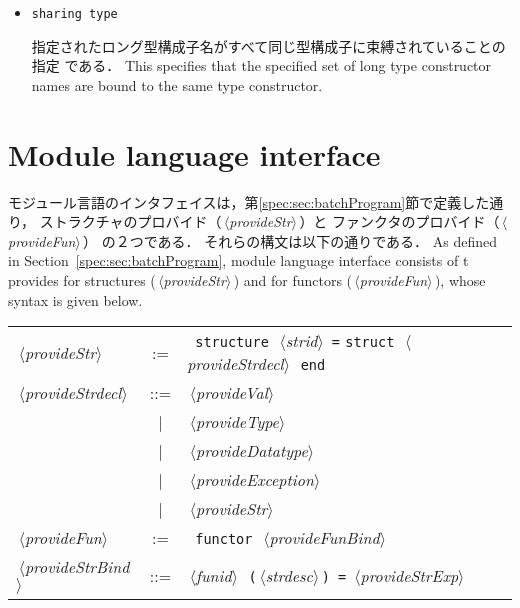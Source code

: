 \documentclass{jbook}
\newcommand{\txt}[2]{#2}
\newcommand{\vbar}{\mbox{\ $|$\ }}
\newcommand{\nonterm}[1]{\mbox{$\,\langle$}{\it #1}\mbox{$\rangle\,$}}
\newcommand{\term}[1]{\mbox{{\tt #1}}}
\begin{document}
\begin{itemize}
\item \term{sharing type}

\ifjp%
	指定されたロング型構成子名がすべて同じ型構成子に束縛されていることの指定
である．
\else%
	This specifies that the specified set of long type constructor
names are bound to the same type constructor.
\fi%

\end{itemize}


\section{\txt{モジュール言語のインタフェイス}{Module language interface}}
\ifjp%
	モジュール言語のインタフェイスは，第\ref{spec:sec:batchProgram}節で定義した通り，
ストラクチャのプロバイド（\nonterm{provideStr}）と
ファンクタのプロバイド（\nonterm{provideFun}）
の２つである．
	それらの構文は以下の通りである．
\else%
	As defined in Section~\ref{spec:sec:batchProgram}, module language interface consists of t
provides for structures (\nonterm{provideStr}) and for 
functors (\nonterm{provideFun}), whose syntax is given below.
\fi%

\begin{center}
\begin{tabular}{lcll}
\nonterm{provideStr} &:= &\ \term{structure}\ \nonterm{strid} \term{=} 
\term{struct}\ \nonterm{provideStrdecl}\ \term{end}\\
\nonterm{provideStrdecl} 
&::=&   \nonterm{provideVal}\\
&\vbar& \nonterm{provideType}\\
&\vbar& \nonterm{provideDatatype}\\
&\vbar& \nonterm{provideException}\\
&\vbar& \nonterm{provideStr}\\
\nonterm{provideFun}
  &:= &\ \term{functor}\ \nonterm{provideFunBind}\\
\nonterm{provideStrBind} &::=&
	\nonterm{funid}\ \term{(}\nonterm{strdesc}\term{)}\ \term{=} \nonterm{provideStrExp}\\
\end{tabular}
\end{center}
\end{document}
